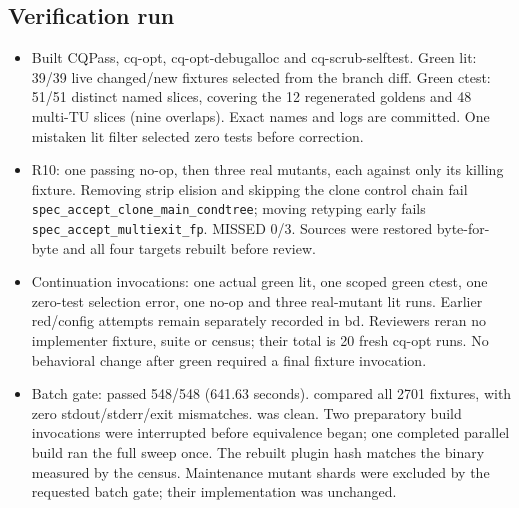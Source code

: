 \subsection*{Verification run}
\begin{itemize}
  \item Built CQPass, cq-opt, cq-opt-debugalloc and cq-scrub-selftest.
  Green lit: 39/39 live changed/new fixtures selected from the branch diff.
  Green ctest: 51/51 distinct named slices, covering the 12 regenerated goldens
  and 48 multi-TU slices (nine overlaps). Exact names and logs are committed.
  One mistaken lit filter selected zero tests before correction.
  \item R10: one passing no-op, then three real mutants, each against only its
  killing fixture. Removing strip elision and skipping the clone control chain
  fail \texttt{spec\_accept\_clone\_main\_condtree}; moving retyping early fails
  \texttt{spec\_accept\_multiexit\_fp}. MISSED 0/3. Sources were restored
  byte-for-byte and all four targets rebuilt before review.
  \item Continuation invocations: one actual green lit, one scoped green ctest,
  one zero-test selection error, one no-op and three real-mutant lit runs.
  Earlier red/config attempts remain separately recorded in bd. Reviewers reran
  no implementer fixture, suite or census; their total is 20 fresh cq-opt runs.
  No behavioral change after green required a final fixture invocation.
  \item Batch gate: 
  passed 548/548 (641.63 seconds). 
  compared all 2701 fixtures, with zero stdout/stderr/exit mismatches.
   was clean.
  Two preparatory build invocations were interrupted before equivalence began;
  one completed parallel build ran the full sweep once. The rebuilt plugin hash
  matches the binary measured by the census. Maintenance mutant shards were
  excluded by the requested batch gate; their implementation was unchanged.
\end{itemize}

